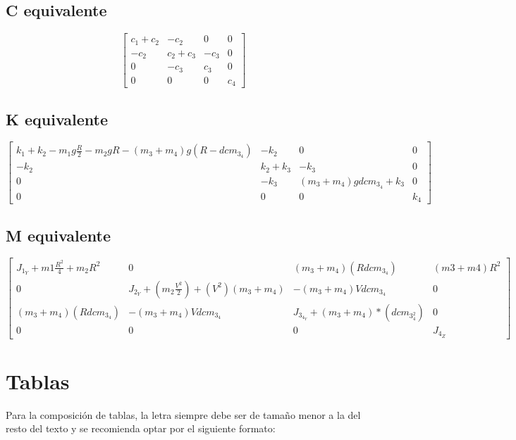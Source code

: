 \documentclass{aleph-revista}
\begin{document}
{\subsection{C equivalente}   
\begin{equation}
\begin{bmatrix}
c_1+c_2 & -c_2 & 0 & 0\\
-c_2 & c_2+c_3 & -c_3 & 0\\
0 & -c_3 & c_3 & 0\\
0 & 0 & 0 & c_4
\end{bmatrix}
\end{equation} 

\subsection{K equivalente}   
\begin{equation}
\begin{bmatrix}
k_1+k_2-m_1g\frac{R}{2}-m_2gR-(m_3+m_4)g(R-dcm_3_4) & -k_2 & 0 & 0\\
-k_2 & k_2+k_3 & -k_3 & 0\\
0 & -k_3 & (m_3+m_4)gdcm_3_4 + k_3 & 0\\
0 & 0 & 0 & k_4
\end{bmatrix}
\end{equation}

\subsection{M equivalente}   
\begin{equation}
\begin{bmatrix}
J_1_Y + m1\frac{R^2}{4}+m_2R^2 & 0 & (m_3+m_4)(Rdcm_3_4) & (m3+m4)R^2\\
0 &J_2_Y+(m_2\frac{V^2}{2})+(V^2)(m_3+m_4) &-(m_3+m_4)Vdcm_3_4 & 0 \\
(m_3+m_4)(Rdcm_3_4) & -(m_3+m_4)Vdcm_3_4 & J_3_4_Y+(m_3+m_4)*(dcm_3_4^2) & 0\\
0 & 0 & 0 & J_4_Z
\end{bmatrix}
\end{equation}
   
\section{Tablas}

Para la composición de tablas, la letra siempre debe ser de tamaño menor a la del resto del texto y se recomienda optar por el siguiente formato:

}
\end{document}
